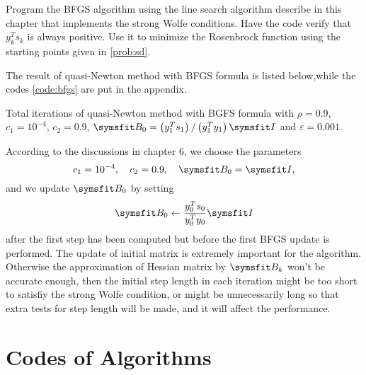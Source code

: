 \documentclass{assignment}[2019/09/15]
\begin{document}
    \begin{problem}
        Program the BFGS algorithm using the line search algorithm describe in this chapter that implements the strong Wolfe conditions. Have the code verify that $y_k^Ts_k$ is always positive. Use it to minimize the Rosenbrock function using the starting points given in \ref{prob:sd}.
    \end{problem}
    \begin{solution}
        The result of quasi-Newton method with BFGS formula is listed below,while the codes \ref{code:bfgs} are put in the appendix.
        \begin{table}[htb]
            \begin{center}
                \caption{Total iterations of quasi-Newton method with BGFS formula with $\rho=0.9$, $c_1 = 10^{-4}$, $c_2=0.9$, $\matr{B}_0=\left(y_1^Ts_1\right)/\left(y_1^Ty_1\right)\matr{I}$ and $\varepsilon=0.001$.}
            \end{center}
        \end{table}
        According to the discussions in chapter 6, we choose the parameters
        \begin{equation}
            c_1 = 10^{-4},\quad c_2=0.9,\quad \matr{B}_0=\matr{I},
        \end{equation}
        and we update $\matr{B}_0$ by setting
        \begin{equation}
            \matr{B}_0 \leftarrow \frac{y_0^Ts_0}{y_0^Ty_0}\matr{I}
        \end{equation}
        after the first step has been computed but before the first BFGS update is performed. The update of initial matrix is extremely important for the algorithm. Otherwise the approximation of Hessian matrix by $\matr{B}_k$ won't be accurate enough, then the initial step length in each iteration might be too short to satisfiy the strong Wolfe condition, or might be unnecessarily long so that extra tests for step length will be made, and it will affect the performance.
    \end{solution}

    \clearpage\appendix
    \section{Codes of Algorithms}
\end{document}
